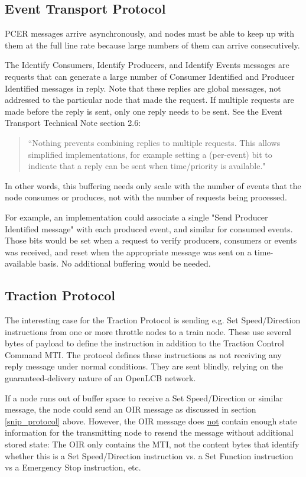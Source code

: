 \documentclass[11pt]{article}
\begin{document}
\subsection{Event Transport Protocol}

PCER messages arrive asynchronously, and nodes must be able to keep up with them
at the full line rate because large numbers of them can arrive consecutively.

The Identify Consumers, Identify Producers, and Identify Events messages 
are requests that can generate a large number of Consumer Identified and Producer Identified 
messages in reply.  Note that these replies are global messages, not addressed to 
the particular node that made the request.  If multiple requests are made before
the reply is sent, only one reply needs to be 
sent. See the Event Transport Technical Note section 2.6: 
\begin{quote}
    ``Nothing prevents combining replies to multiple requests. 
    This allows simplified implementations, 
    for example setting a (per-event) bit to indicate that a reply can be sent 
    when time/priority is available."
\end{quote}
In other words, this buffering needs only scale with the number of events
that the node consumes or produces, not with the number of requests being processed.

\cbstart
For example, an implementation could associate a single
"Send Producer Identified message" with each produced event, 
and similar for consumed events.  Those bits would be set when a request to 
verify producers, consumers or events was received, and reset when the
appropriate message was sent on a time-available basis. No additional
buffering would be needed.
\cbend

\cbstart
\subsection{Traction Protocol}\label{traction_protocol}

The interesting case for the Traction Protocol is sending e.g.
Set Speed/Direction instructions from one or more throttle nodes to a train node.
These use several bytes of payload to define the instruction in addition to the 
Traction Control Command MTI.
The protocol defines these instructions as not receiving any reply message
under normal conditions.  They are sent blindly, relying on the 
guaranteed-delivery nature of an OpenLCB network.

If a node runs out of buffer space to receive a Set Speed/Direction
or similar message, the node could send an OIR message
as discussed in 
section \ref{snip_protocol} above.
However, the OIR message does 
\underline{not} contain enough state information for the
transmitting node to resend the message without additional stored state:
The OIR only contains the MTI, not the content bytes that 
identify whether this is a Set Speed/Direction instruction vs.
a Set Function instruction vs a Emergency Stop instruction, etc.
\end{document}
